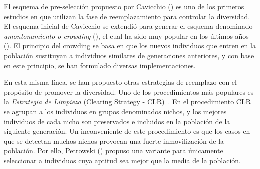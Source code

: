 El esquema de pre-selección propuesto por Cavicchio (\cite{grefenstette1986optimization}) es uno de los primeros estudios 
en que utilizan la fase de reemplazamiento para controlar la diversidad.
%
El esquema inicial de Cavicchio se extendió para generar el esquema denominado \textit{amontonamiento o crowding} 
(\cite{de1975analysis}), el cual ha sido muy popular en los últimos años (\cite{mahfoud1992crowding, mengshoel2014adaptive}).
%
El principio del crowding se basa en que los nuevos individuos que entren en la población sustituyan a individuos similares 
de generaciones anteriores, y con base en este principio, se han formulado diversas implementaciones.

En esta misma línea, se han propuesto otras estrategias de reemplazo con el propósito de promover la diversidad.
%
Uno de los procedimientos más populares es la \textit{Estrategia de Limpieza} (Clearing Strategy - CLR)~\cite{lozano2008replacement}.
%
En el procedimiento CLR se agrupan a los individuos en grupos denominados nichos, y los mejores individuos de cada nicho 
son preservados e incluidos en la población de la siguiente generación.
%
Un inconveniente de este procedimiento es que los casos en que se detectan muchos nichos provocan una fuerte inmovilización 
de la población.
%
Por ello, Petrowski (\cite{petrowski1996clearing}) propuso una variante para únicamente seleccionar a individuos cuya aptitud 
sea mejor que la media de la población.

